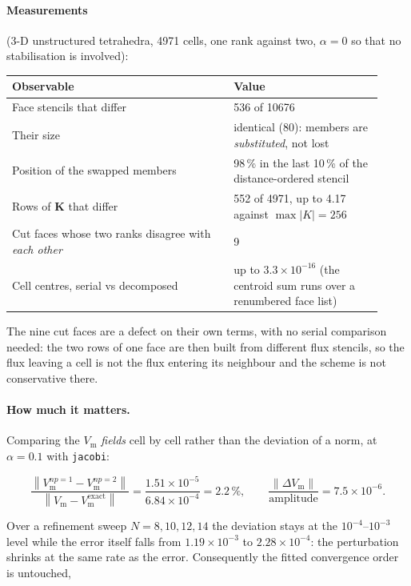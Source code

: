 \documentclass[11pt,a4paper]{article}
\newcommand{\code}[1]{\texttt{\small #1}}
\newcommand{\Kstif}{\mathbf{K}}
\newcommand{\norm}[1]{\left\lVert #1 \right\rVert}
\begin{document}
\paragraph{Measurements} (3-D unstructured tetrahedra, 4971 cells, one rank
against two, $\alpha=0$ so that no stabilisation is involved):

\begin{center}
\begin{tabular}{@{}p{0.55\linewidth}p{0.37\linewidth}@{}}
\toprule
Observable & Value \\
\midrule
Face stencils that differ & 536 of 10676 \\
Their size & identical (80): members are \emph{substituted}, not lost \\
Position of the swapped members & 98\,\% in the last 10\,\% of the
   distance-ordered stencil \\
Rows of $\Kstif$ that differ & 552 of 4971, up to 4.17 against
   $\max|K|=256$ \\
Cut faces whose two ranks disagree with \emph{each other} & 9 \\
Cell centres, serial vs decomposed & up to $3.3\times10^{-16}$ (the centroid sum
   runs over a renumbered face list) \\
\bottomrule
\end{tabular}
\end{center}

The nine cut faces are a defect on their own terms, with no serial comparison
needed: the two rows of one face are then built from different flux stencils, so
the flux leaving a cell is not the flux entering its neighbour and the scheme is
not conservative there.

\paragraph{How much it matters.} Comparing the $V_{\mathrm{m}}$ \emph{fields}
cell by cell rather than the deviation of a norm, at $\alpha=0.1$ with
\code{jacobi}:

\[
  \frac{\norm{V_{\mathrm{m}}^{np=1}-V_{\mathrm{m}}^{np=2}}}
       {\norm{V_{\mathrm{m}}-V_{\mathrm{m}}^{\text{exact}}}}
  = \frac{1.51\times10^{-5}}{6.84\times10^{-4}} = 2.2\,\%,
  \qquad
  \frac{\norm{\Delta V_{\mathrm{m}}}}{\text{amplitude}} = 7.5\times10^{-6}.
\]

Over a refinement sweep $N=8,10,12,14$ the deviation stays at the
$10^{-4}$--$10^{-3}$ level while the error itself falls from
$1.19\times10^{-3}$ to $2.28\times10^{-4}$: the perturbation shrinks at the same
rate as the error. Consequently the fitted convergence order is untouched,
\end{document}

